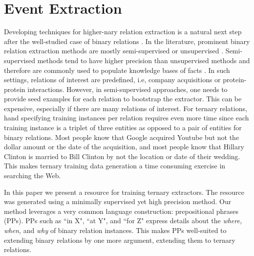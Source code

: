 \section{Event Extraction}
% 

Developing techniques for higher-nary relation extraction  is a natural next step  after  the well-studied case of binary relations \cite{Auer07,suchanek2007yago,Bollacker2008,Carlson2010,MitchellCHTBCMG15}.  
  In the literature, prominent  binary relation extraction methods  are mostly  semi-supervised \cite{Suchanek:2009,Carlson2010} or  unsupervised  \cite{Mausam2012,fader2011identifying}. Semi-supervised methods tend to have higher precision than unsupervised methods and therefore are commonly used to populate knowledge bases  of facts \cite{Nakashole2011,MitchellCHTBCMG15}. In such settings,  relations of interest are predefined, i.e, company acquisitions or  protein-protein interactions.
However,  in semi-supervised approaches,  one needs to provide seed examples for each relation to bootstrap the extractor. This can be expensive, especially if there are many relations of interest. For ternary relations, hand specifying training instances per relation  requires even more time since each training instance is a triplet of three entities as opposed to a pair of entities for binary relations.  Most people know that Google acquired Youtube but not the dollar amount or the date of the acquisition, and most people know that Hillary Clinton is married to Bill Clinton by not the location or date of their wedding. This makes ternary training data generation  a  time consuming exercise in searching the Web. 
 
In this paper we present a resource  for training  ternary extractors. The resource was generated using a minimally supervised yet  high precision method.
Our method leverages a very common language construction: prepositional phrases (PPs).   PPs such as  ``in X", ``at Y", and ``for Z" express details about the  \textit{where, when,} and \textit{why}  of  binary relation instances. This makes PPs well-suited to extending binary relations by one more argument, extending them to ternary relations.
 
